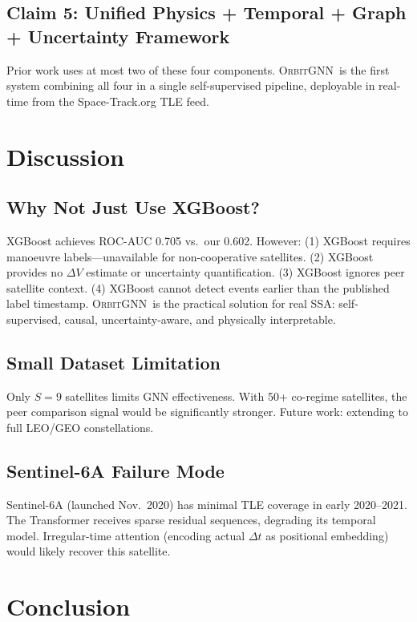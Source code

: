 \documentclass[journal]{IEEEtran}
\newcommand{\orbitgnn}{\textsc{OrbitGNN}}
\begin{document}
\subsection{Claim 5: Unified Physics + Temporal + Graph + Uncertainty Framework}
Prior work uses at most two of these four components. \orbitgnn\ is the
first system combining all four in a single self-supervised pipeline,
deployable in real-time from the Space-Track.org TLE feed.

\section{Discussion}

\subsection{Why Not Just Use XGBoost?}
XGBoost achieves ROC-AUC 0.705 vs.\ our 0.602. However:
(1) XGBoost requires manoeuvre labels---unavailable for non-cooperative satellites.
(2) XGBoost provides no $\Delta V$ estimate or uncertainty quantification.
(3) XGBoost ignores peer satellite context.
(4) XGBoost cannot detect events earlier than the published label timestamp.
\orbitgnn\ is the practical solution for real SSA: self-supervised,
causal, uncertainty-aware, and physically interpretable.

\subsection{Small Dataset Limitation}
Only $S=9$ satellites limits GNN effectiveness. With 50+ co-regime
satellites, the peer comparison signal would be significantly stronger.
Future work: extending to full LEO/GEO constellations.

\subsection{Sentinel-6A Failure Mode}
Sentinel-6A (launched Nov.\ 2020) has minimal TLE coverage in early 2020--2021.
The Transformer receives sparse residual sequences, degrading its temporal model.
Irregular-time attention (encoding actual $\Delta t$ as positional embedding)
would likely recover this satellite.

\section{Conclusion}
\end{document}
